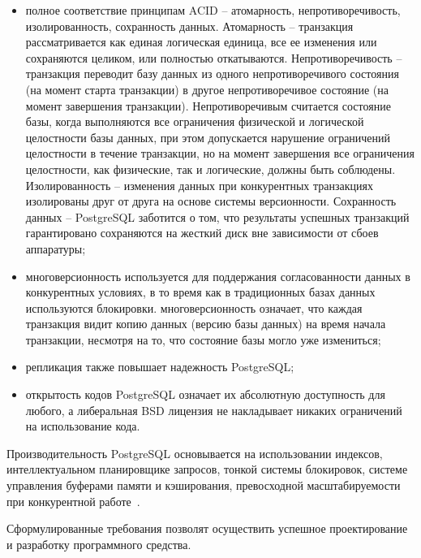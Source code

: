 \begin{itemize}
	\item полное соответствие принципам ACID -- атомарность, непротиворечивость, изолированность, сохранность данных.
	Атомарность -- транзакция рассматривается как единая логическая единица, все ее изменения или сохраняются целиком,
	или полностью откатываются. Непротиворечивость -- транзакция переводит базу данных из одного непротиворечивого
	состояния (на момент старта транзакции) в другое непротиворечивое состояние (на момент завершения транзакции).
	Непротиворечивым считается состояние базы, когда выполняются все ограничения физической и логической целостности
	базы данных, при этом допускается нарушение ограничений целостности в течение транзакции, но на момент завершения все
	ограничения целостности, как физические, так и логические, должны быть соблюдены. Изолированность -- изменения данных
	при конкурентных транзакциях изолированы друг от друга на основе системы версионности.
	Сохранность данных -- PostgreSQL заботится о том, что результаты успешных транзакций гарантировано сохраняются на
	жесткий диск вне зависимости от сбоев аппаратуры;
	\item многоверсионность используется для поддержания согласованности данных в конкурентных условиях, в то время как в
	традиционных базах данных используются блокировки. многоверсионность означает, что каждая транзакция видит копию
	данных (версию базы данных) на время начала транзакции, несмотря на то, что состояние базы могло уже измениться;
	\item репликация также повышает надежность PostgreSQL;
	\item открытость кодов PostgreSQL означает их абсолютную доступность для любого, а либеральная BSD лицензия не
	накладывает никаких ограничений на использование кода.
\end{itemize}

Производительность PostgreSQL основывается на использовании индексов, интеллектуальном планировщике запросов,
тонкой системы блокировок, системе управления буферами памяти и кэширования, превосходной масштабируемости при
конкурентной работе~\cite{postgres}.

Сформулированные требования позволят осуществить успешное проектирование и разработку программного средства.
